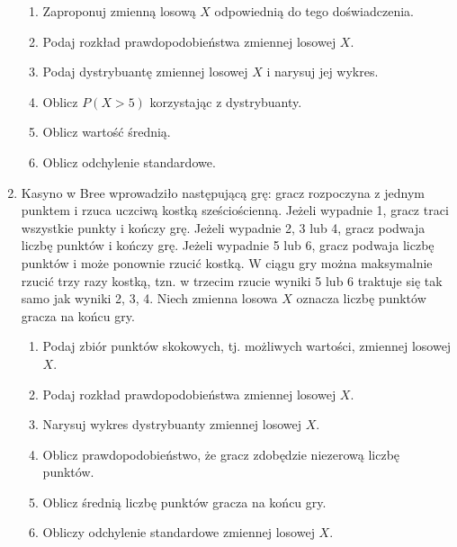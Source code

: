 \documentclass[twoside]{mwart}
\newcommand{\ans}[1]{}
\newcommand{\ans}[1]{\par\emph{Odpowiedź:} #1}
\begin{document}
\begin{enumerate}
\begin{enumerate}
\item Zaproponuj zmienną losową $X$ odpowiednią do tego doświadczenia. \ans{$X\colon\Omega\to\{1,\ldots,12\}$}
\item Podaj rozkład prawdopodobieństwa zmiennej losowej $X$. \ans{$(1,2,3,4,5,6,5,4,3,2,1)/36$}
\item Podaj dystrybuantę zmiennej losowej $X$ i narysuj jej wykres.
\item Oblicz $P(X>5)$ korzystając z dystrybuanty.
\item Oblicz wartość średnią. \ans{$7$}
\item Oblicz odchylenie standardowe. \ans{$\sqrt{D^2X}=\sqrt{54{,}83-49}=2{,}42$}
\end{enumerate}
\item Kasyno w Bree wprowadziło następującą grę: gracz rozpoczyna z jednym punktem i rzuca uczciwą kostką sześciościenną.
Jeżeli wypadnie 1, gracz traci wszystkie punkty i kończy grę.
Jeżeli wypadnie 2, 3 lub 4, gracz podwaja liczbę punktów i kończy grę.
Jeżeli wypadnie 5 lub 6, gracz podwaja liczbę punktów i może ponownie rzucić kostką.
W ciągu gry można maksymalnie rzucić trzy razy kostką, tzn. w trzecim rzucie wyniki 5 lub 6 traktuje się tak samo jak wyniki 2, 3, 4.
Niech zmienna losowa $X$ oznacza liczbę punktów gracza na końcu gry.
\begin{enumerate}
\item Podaj zbiór punktów skokowych, tj. możliwych wartości, zmiennej losowej $X$.
\ans{$\{0, 2, 4, 8\}$}
\item Podaj rozkład prawdopodobieństwa zmiennej losowej $X$.
\ans{
\[ P(X=2)=\frac{3}{6}=\frac{1}{2} \qquad P(X=4)=\frac{2}{6}\frac{3}{6}=\frac{1}{6} \qquad P(X=8)=\frac{2}{6}\frac{2}{6}\frac{5}{6}=\frac{5}{54} \]
\[ P(X=0)=\frac{1}{6}+\frac{2}{6}\frac{1}{6}+\frac{2}{6}\frac{2}{6}\frac{1}{6}=\frac{13}{54}\]
}
\item Narysuj wykres dystrybuanty zmiennej losowej $X$.
\item Oblicz prawdopodobieństwo, że gracz zdobędzie niezerową liczbę punktów.
\ans{ \[P(X>0)=1-P(X=0)=\frac{41}{54} \]}
\item Oblicz średnią liczbę punktów gracza na końcu gry.
\ans{
\[ EX=2\frac{1}{2}+4\frac{1}{6}+8\frac{5}{54}=\frac{65}{27} \]
}
\item Obliczy odchylenie standardowe zmiennej losowej $X$.
\ans{
\[ EX^2 = 4\frac{1}{2}+16\frac{1}{6}+64\frac{5}{54}=\frac{286}{27} \qquad D^2X = \frac{286}{27}-\left(\frac{65}{27}\right)^2=\frac{3497}{27^2} \qquad DX=\frac{\sqrt{3497}}{27} \]
}
\end{enumerate}
\end{enumerate}
\end{document}
